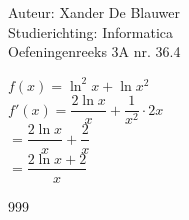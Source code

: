 \documentclass[a4paper]{article}
\begin{document}
\noindent \large Auteur: Xander De Blauwer \\
\noindent \large Studierichting: Informatica\\
\noindent \large Oefeningenreeks 3A nr. 36.4 \\

\medskip

$f(x) = \ln^2 x + \ln x^2$ \\

$f'(x) = \dfrac{2\ln x}{x} + \dfrac{1}{x^2} \cdot 2x $ \\

$ = \dfrac{2\ln x}{x} + \dfrac{2}{x} $ \\

$ = \dfrac{2\ln x + 2}{x} $ \\





\begin{thebibliography}{999}
\end{thebibliography}
\end{document}
